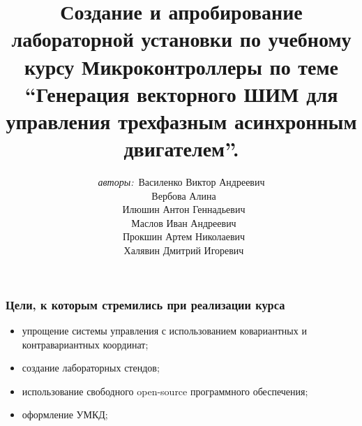 \documentclass[14pt]{beamer}
\begin{document}
\title{\small{Создание и апробирование лабораторной установки по учебному курсу Микроконтроллеры по теме \enquote{Генерация векторного ШИМ для управления трехфазным асинхронным двигателем}.}}
\author{\small{%
\emph{авторы:}~Василенко Виктор Андреевич\\%
\emph{}~Вербова Алина\\
\emph{}~Илюшин Антон Геннадьевич\\
\emph{}~Маслов Иван Андреевич\\
\emph{}~Прокшин Артем Николаевич\\%
\emph{}~Халявин Дмитрий Игоревич}}



\vspace{30pt}%

\vspace{60pt}%



\begin{frame}
\titlepage	
\end{frame}

\begin{frame}
\frametitle{\small Цели, к которым стремились при реализации курса} 
\begin{itemize}
\item упрощение системы управления с использованием ковариантных и контравариантных координат;
\item создание лабораторных стендов; %
\item использование свободного open-source программного обеспечения;
\item оформление УМКД;
\end{itemize}
\end{frame}
\end{document}
